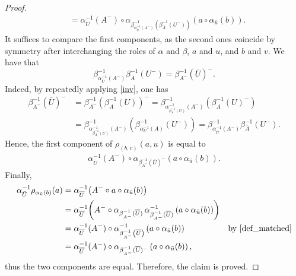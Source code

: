 \documentclass[preprint,1p]{elsarticle}
\theoremstyle{definition}               %
\begin{document}
\begin{proof}
\begin{align*}
   &=\alpha^{-1}_{\overline{U}}(A^-)\circ \alpha_{\beta^{-1}_{\alpha^{-1}_{\overline{U}}\left(A^-\right)}\left(\beta^{-1}_{\overline{A}}\left(U^-\right)\right)}\left(a \circ \alpha_{\bar{u}}(b)\right).
\end{align*}
It suffices to compare the first components, as the second ones coincide by symmetry after interchanging the roles of $\alpha$ and $\beta$, $a$ and $u$, and $b$ and $v$. We have that
\[
\beta^{-1}_{
\alpha_{\overline U}^{-1}(A^{-})}
\beta_{\overline A}^{-1}(U^{-})
=
\beta_{A^{-}}^{-1}\left(\overline U\right)^{-}.
\]
Indeed, by repeatedly applying \eqref{inv}, one has
\begin{align*}
    \beta^{-1}_{A^-}(\overline{U})^-&=\beta_{A^-}^{-1}\left(\beta^{-1}_A(U)\right)^-=\beta^{-1}_{
\alpha_{\beta_A^{-1}(U)}^{-1}(A^-)}
\left(
\beta_A^{-1}(U)^{-}
\right) \\
&=
\beta^{-1}
_{\alpha_{\beta_A^{-1}(U)}^{-1}(A^{-})}
\left(
\beta_{\alpha_U^{-1}(A)}^{-1}(U^{-})
\right)=\beta^{-1}_{
\alpha_{\overline U}^{-1}(A^{-})}
\beta_{\overline A}^{-1}(U^{-}).
\end{align*}
Hence, the first component of $\rho_{(b, v)}(a, u)$ is equal to
\begin{align*}
   \alpha^{-1}_{\overline{U}}(A^-)\circ \alpha_{\beta^{-1}_{A^-}(\overline{U})^-}\left(a \circ \alpha_{\bar{u}}(b)\right).
\end{align*}
Finally, \begin{align*}
\alpha_{\bar U}^{-1}\rho_{\alpha_{\bar u}(b)}(a)
&=
\alpha_{\overline U}^{-1}\!\left(
A^{-}
\circ a
\circ \alpha_{\bar u}(b)
\right)                                                   \\
&=
\alpha_{\overline U}^{-1}\!\left(
A^{-}\circ
\alpha_{\beta_{A^{-}}^{-1}(\overline U)}\,
\alpha_{\beta_{A^{-}}^{-1}(\overline U)}^{-1}
\left(
a\circ\alpha_{\bar u}(b)
\right)
\right)                                                   \\
&=
\alpha_{\overline U}^{-1}(A^{-})
\circ
\alpha_{\beta_{A^{-}}^{-1}\left(\overline U\right)}^{-1}
\left(
a\circ\alpha_{\bar u}(b)
\right) &\mbox{by \cref{def_matched}}\\
&=\alpha^{-1}_{\overline{U}}(A^-)\circ \alpha_{\beta^{-1}_{A^-}(\overline{U})^-}\left(a \circ \alpha_{\bar{u}}(b)\right),
\end{align*}
thus the two components are equal. Therefore, the claim is proved.
   \end{proof}
\end{document}
